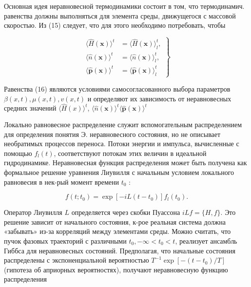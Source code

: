 \documentclass[10pt]{article}
\begin{document}
Основная идея неравновесной термодинамики состоит в том, что термодинамич. равенства должны выполняться для элемента среды, движущегося с массовой скоростью. Из (15) следует, что для этого необходимо потребовать, чтобы



\[

\left.\begin{array}{rl}

\langle\hat{H}(\boldsymbol{x})\rangle^{t} & =\langle\hat{H}(\boldsymbol{x})\rangle_{l}^{t}, \\

\langle\hat{n}(\boldsymbol{x})\rangle^{t} & =\langle\hat{n}(\boldsymbol{x})\rangle_{l}^{t}, \\

\langle\hat{\boldsymbol{p}}(\boldsymbol{x})\rangle^{t} & =\langle\hat{\boldsymbol{p}}(\boldsymbol{x})\rangle_{l}^{t}

\end{array}\right\}

\]



Равенства (16) являются условиями самосогласованного выбора параметров $\beta(x, t), \mu(x, t), v(x, t)$ и определяют их зависимость от неравновесных средних значений $\langle\hat{H}(x)\rangle^{t}$, $\langle\hat{n}(\boldsymbol{x})\rangle^{t}\langle\hat{\boldsymbol{p}}(\boldsymbol{x})\rangle^{t}$



Локально равновесное распределение служит вспомогательным распределением для определения понятия $Э$. неравновесного состояния, но не описывает необратимых процессов переноса. Потоки энергии и импульса, вычисленные с помощью $f_{l}(t)$, соответствуют потокам этих величин в идеальной гидродинамике. Неравновесная функция распределения может быть получена как формальное решение уравнения Лиувилля с начальным условием локального равновесия в нек-рый момент времени $t_{0}$ :



\[

f\left(t ; t_{0}\right)=\exp \left[-i L\left(t-t_{0}\right)\right] f_{l}\left(t_{0}\right) .

\]



Оператор Лиувилля $L$ определяется через скобки Пуассона $i L f=\{H, f\}$. Это решение зависит от начального состояния, к-рое реальная система должна «забывать» из-за корреляций между элементами среды. Можно считать, что пучок фазовых траекторий с различными $t_{0},-\infty<t_{0}<t$, реализует ансамбль Гиббса для неравновесных состояний. Предполагая, что начальные состояния распределены с экспоненциальной вероятностью $T^{-1} \exp \left[-\left(t-t_{0}\right) / T\right]$ (гипотеза об априорных вероятностях), получают неравновесную функцию распределения
\end{document}
